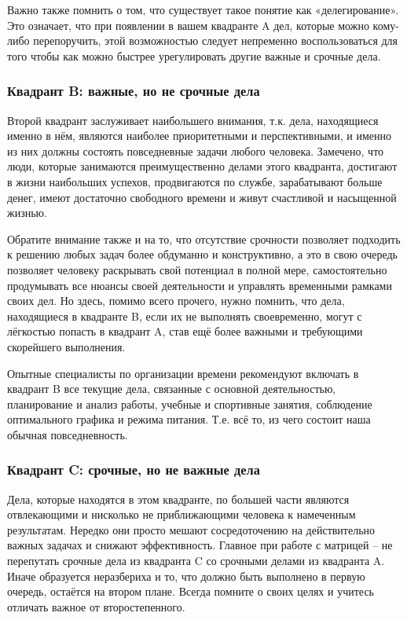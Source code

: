 Важно также помнить о том, что существует такое понятие как «делегирование». Это означает, что при появлении в вашем квадранте A дел, которые можно кому-либо перепоручить, этой возможностью следует непременно воспользоваться для того чтобы как можно быстрее урегулировать другие важные и срочные дела.

\subsubsection{Квадрант B: важные, но не срочные дела }


Второй квадрант заслуживает наибольшего внимания, т.к. дела, находящиеся именно в нём, являются наиболее приоритетными и перспективными, и именно из них должны состоять повседневные задачи любого человека. Замечено, что люди, которые занимаются преимущественно делами этого квадранта, достигают в жизни наибольших успехов, продвигаются по службе, зарабатывают больше денег, имеют достаточно свободного времени и живут счастливой и насыщенной жизнью.

Обратите внимание также и на то, что отсутствие срочности позволяет подходить к решению любых задач более обдуманно и конструктивно, а это в свою очередь позволяет человеку раскрывать свой потенциал в полной мере, самостоятельно продумывать все нюансы своей деятельности и управлять временными рамками своих дел. Но здесь, помимо всего прочего, нужно помнить, что дела, находящиеся в квадранте B, если их не выполнять своевременно, могут с лёгкостью попасть в квадрант A, став ещё более важными и требующими скорейшего выполнения.

Опытные специалисты по организации времени рекомендуют включать в квадрант B все текущие дела, связанные с основной деятельностью, планирование и анализ работы, учебные и спортивные занятия, соблюдение оптимального графика и режима питания. Т.е. всё то, из чего состоит наша обычная повседневность.

\subsubsection{Квадрант C: срочные, но не важные дела }


Дела, которые находятся в этом квадранте, по большей части являются отвлекающими и нисколько не приближающими человека к намеченным результатам. Нередко они просто мешают сосредоточению на действительно важных задачах и снижают эффективность. Главное при работе с матрицей – не перепутать срочные дела из квадранта C со срочными делами из квадранта A. Иначе образуется неразбериха и то, что должно быть выполнено в первую очередь, остаётся на втором плане. Всегда помните о своих целях и учитесь отличать важное от второстепенного.

